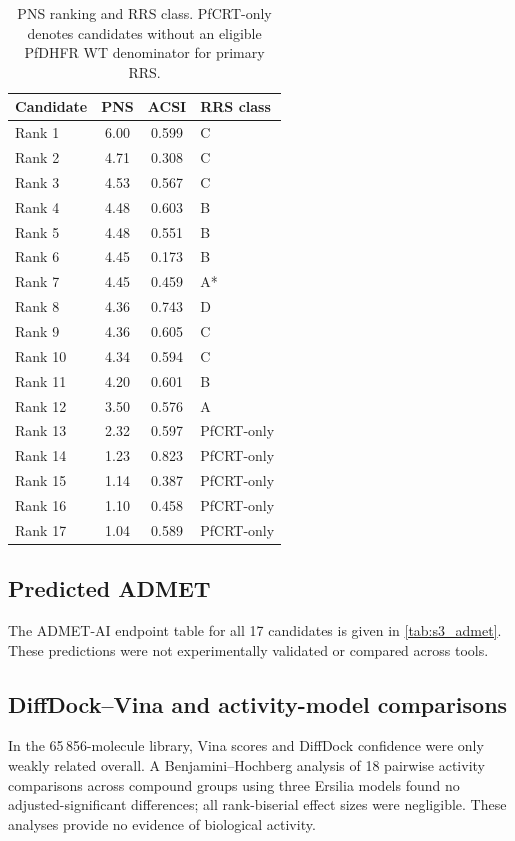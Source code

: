 \begin{table}[htbp]
\centering
\caption{PNS ranking and RRS class. PfCRT-only denotes candidates without an eligible PfDHFR WT denominator for primary RRS.}
\label{tab:secondary_pns}
\begin{tabular}{l S[table-format=1.2] S[table-format=1.3] l}
\toprule
Candidate & {PNS} & {ACSI} & {RRS class} \\
\midrule
Rank 1 & 6.00 & 0.599 & C \\
Rank 2 & 4.71 & 0.308 & C \\
Rank 3 & 4.53 & 0.567 & C \\
Rank 4 & 4.48 & 0.603 & B \\
Rank 5 & 4.48 & 0.551 & B \\
Rank 6 & 4.45 & 0.173 & B \\
Rank 7 & 4.45 & 0.459 & A* \\
Rank 8 & 4.36 & 0.743 & D \\
Rank 9 & 4.36 & 0.605 & C \\
Rank 10 & 4.34 & 0.594 & C \\
Rank 11 & 4.20 & 0.601 & B \\
Rank 12 & 3.50 & 0.576 & A \\
Rank 13 & 2.32 & 0.597 & PfCRT-only \\
Rank 14 & 1.23 & 0.823 & PfCRT-only \\
Rank 15 & 1.14 & 0.387 & PfCRT-only \\
Rank 16 & 1.10 & 0.458 & PfCRT-only \\
Rank 17 & 1.04 & 0.589 & PfCRT-only \\
\bottomrule
\end{tabular}
\end{table}

\subsection*{Predicted ADMET}

The ADMET-AI\citep{admetai_2023} endpoint table for all 17 candidates is given in \cref{tab:s3_admet}. These predictions were not experimentally validated or compared across tools.

\subsection*{DiffDock--Vina and activity-model comparisons}

In the 65\,856-molecule library, Vina\citep{vina_2021} scores and DiffDock\citep{diffdock_2023} confidence were only weakly related overall. A Benjamini--Hochberg analysis of \num{18} pairwise activity comparisons across compound groups using three Ersilia\citep{ersilia_2023} models found no adjusted-significant differences; all rank-biserial effect sizes were negligible. These analyses provide no evidence of biological activity.
